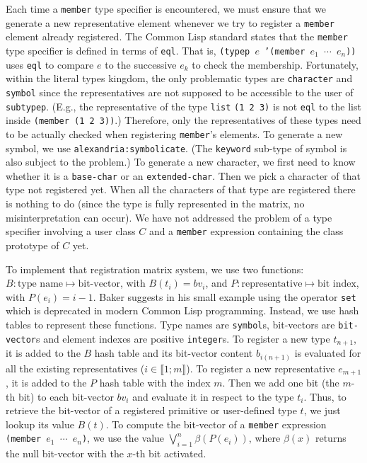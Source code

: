 \documentclass[format=sigconf]{acmart}
\newcommand\intvl[1]{\llbracket#1\rrbracket}
\newcommand\code[2][\small]{\sloppy\texttt{#1#2}}
\theoremstyle{definition}
\begin{document}
Each time a \code{member} type specifier is encountered, we must ensure that we
generate a new representative element whenever we try to register a
\code{member} element already registered. The Common Lisp standard
\cite{bib:ansi.94.cl} states that the \code{member} type specifier is defined in
terms of \code{eql}. That is, \code{(typep $e$ '(member $e_1$ $\cdots$ $e_n$))}
uses \code{eql} to compare $e$ to the successive $e_k$ to check the membership.
Fortunately, within the literal types kingdom, the only problematic types are
\code{character} and \code{symbol} since the representatives are not supposed to
be accessible to the user of \code{subtypep}. (E.g., the representative of the
type \code{list} \code{(1 2 3)} is not \code{eql} to the list inside
\code{(member (1 2 3))}.) Therefore, only the representatives of these types
need to be actually checked when registering \code{member}'s elements.
To generate a new symbol, we use \code{alexandria:symbolicate}.
(The \code{keyword} sub-type of symbol is also subject to the problem.)
To generate a new character, we first need to know whether it is a
\code{base-char} or an \code{extended-char}. Then we pick a character of that
type not registered yet. When all the characters of that type are registered
there is nothing to do (since the type is fully represented in the matrix, no
misinterpretation can occur). We have not addressed the problem of a type
specifier involving a user class $C$ and a \code{member} expression containing
the class prototype of $C$ yet.

To implement that registration matrix system, we use two functions:
\sloppy${B : \text{type name} \longmapsto \text{bit-vector}}$,
with $B(t_i) = bv_i$, and
\sloppy${P : \text{representative} \longmapsto \text{bit index}}$,
with $P(e_i) = i - 1$.
Baker suggests in his small example \cite{baker1992} using the operator
\code{set} which is deprecated in modern Common Lisp programming. Instead, we
use hash tables to represent these functions. Type names are \code{symbol}s,
bit-vectors are \code{bit-vector}s and element indexes are positive
\code{integer}s. To register a new type $t_{n+1}$, it is added to the $B$ hash
table and its bit-vector content $b_{i(n+1)}$ is evaluated for all the existing
representatives ($i \in \intvl{1;m}$). To register a new representative
$e_{m+1}$, it is added to the $P$ hash table with the index $m$. Then we add one
bit (the $m$-th bit) to each bit-vector $bv_i$ and evaluate it in respect to the
type $t_i$. Thus, to retrieve the bit-vector of a registered primitive or
user-defined type $t$, we just lookup its value $B(t)$. To compute the
bit-vector of a \code{member} expression \code{(member $e_1$ $\cdots$ $e_n$)},
we use the value $\bigvee_{i=1}^n \beta\left(P\left(e_i\right)\right)$, where
$\beta(x)$ returns the null bit-vector with the $x$-th bit activated.
\end{document}
